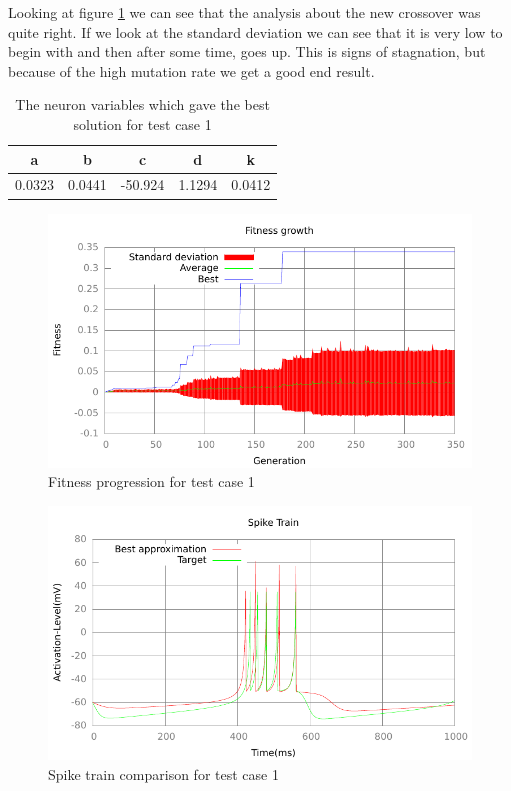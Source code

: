 Looking at figure \ref{fig:fitness-test-case-1} we can see that the analysis
about the new crossover was quite right. If we look at the standard deviation we
can see that it is very low to begin with and then after some time, goes up. This
is signs of stagnation, but because of the high mutation rate we get a good end
result.
\begin{table}[h]
	\begin{tabular}{c c c c c}
		a & b & c & d & k \\
		\hline
		0.0323 & 0.0441 & -50.924 & 1.1294 & 0.0412
	\end{tabular}
	\caption{The neuron variables which gave the best solution for test case
	1}
\end{table}
\begin{figure}[h]
	\centering
	\includegraphics{../output/stdm_izzy_1_fitness.pdf}
	\caption{Fitness progression for test case 1}
	\label{fig:fitness-test-case-1}
\end{figure}
\begin{figure}[h]
	\centering
	\includegraphics{../output/stdm_izzy_1_spike.pdf}
	\caption{Spike train comparison for test case 1}
	\label{fig:spike-test-case-1}
\end{figure}

